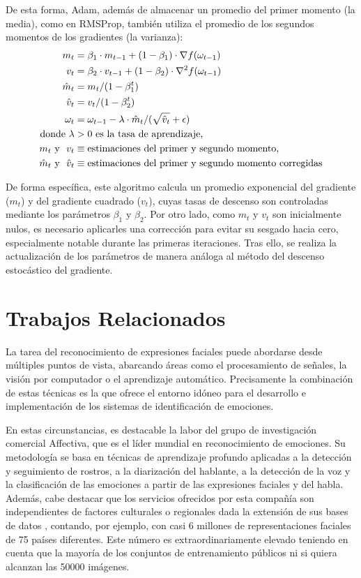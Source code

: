 De esta forma, Adam, además de almacenar un promedio del primer momento (la media), como en RMSProp, también utiliza el promedio de los segundos momentos de los gradientes (la varianza):
\begin{align*}
    m_t &= \beta_1 \cdot m_{t-1} + (1 - \beta_1) \cdot \nabla f(\omega_{t-1}) \\
    v_t &= \beta_2 \cdot v_{t-1} + (1 - \beta_2) \cdot \nabla^2 f(\omega_{t-1}) \\
    \hat{m}_t &= m_t / (1 - \beta_1^t) \\
    \hat{v}_t &= v_t / (1 - \beta_2^t) \\
    \omega_t &= \omega_{t-1} - \lambda \cdot \hat{m}_t / (\sqrt{\hat{v}_t} + \epsilon) \\
    \text{donde}~
    \lambda &> 0 \text{\space es la tasa de aprendizaje,} \\
    m_t \text{\space y \space} v_t &\equiv \text{estimaciones del primer y segundo momento,} \\
    \hat{m}_t \text{\space y \space} \hat{v}_t &\equiv \text{estimaciones del primer y segundo momento corregidas}
\end{align*}

De forma específica, este algoritmo calcula un promedio exponencial del gradiente ($m_t$) y del gradiente cuadrado ($v_t$), cuyas tasas de descenso son controladas mediante los parámetros $\beta_1$ y $\beta_2$. Por otro lado, como $m_t$ y $v_t$ son inicialmente nulos, es necesario aplicarles una corrección para evitar su sesgado hacia cero, especialmente notable durante las primeras iteraciones. Tras ello, se realiza la actualización de los parámetros de manera análoga al método del descenso estocástico del gradiente.

\section{Trabajos Relacionados}

La tarea del reconocimiento de expresiones faciales puede abordarse desde múltiples puntos de vista, abarcando áreas como el procesamiento de señales, la visión por computador o el aprendizaje automático. Precisamente la combinación de estas técnicas es la que ofrece el entorno idóneo para el desarrollo e implementación de los sistemas de identificación de emociones.

En estas circunstancias, es destacable la labor del grupo de investigación comercial Affectiva, que es el líder mundial en reconocimiento de emociones. Su metodología se basa en técnicas de aprendizaje profundo aplicadas a la detección y seguimiento de rostros, a la diarización del hablante, a la detección de la voz y la clasificación de las emociones a partir de las expresiones faciales y del habla. Además, cabe destacar que los servicios ofrecidos por esta compañía son independientes de factores culturales o regionales dada la extensión de sus bases de datos \cite{Affectiva}, contando, por ejemplo, con casi 6 millones de representaciones faciales de 75 países diferentes. Este número es extraordinariamente elevado teniendo en cuenta que la mayoría de los conjuntos de entrenamiento públicos ni si quiera alcanzan las 50000 imágenes.

